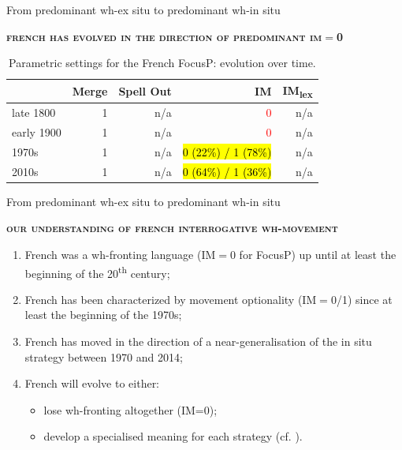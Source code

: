 \documentclass[lesson_slides]{subfiles}
\begin{document}
\begin{frame}[c]{From predominant wh-ex situ to predominant wh-in situ}

        \textbf{\textsc{french has evolved in the direction of predominant im$=$0}}

        \begin{table}[H]
        \centering
        \begin{tabular}{|l|r|r|r|r|}
        \hline
         & Merge & Spell Out & IM & IM\textsubscript{lex} \\
        \hline
        late 1800 & 1 & n/a & \textcolor{red}{0} & n/a \\
        \hline
        early 1900 & 1 & n/a & \textcolor{red}{0} & n/a \\
        \hline
        1970s & 1 & n/a & \hl{0 (22\%) / 1 (78\%)} & n/a \\
        \hline
        2010s & 1 & n/a & \hl{0 (64\%) / 1 (36\%)} & n/a \\
        \hline
        \end{tabular}
        \caption{\label{tab:samp}Parametric settings for the French FocusP: evolution over time.}
    \end{table}
  
\end{frame}
\begin{frame}[c]{From predominant wh-ex situ to predominant wh-in situ}


    \noindent \textbf{\textsc{our understanding of french interrogative wh-movement}} \pause
    \begin{enumerate}
        \item French was a wh-fronting language (IM$=$0 for FocusP) up until at least the beginning of the 20\textsuperscript{th} century;\pause
        \item French has been characterized by movement optionality (IM$=$0/1) since at least the beginning of the 1970s; \pause
        \item French has moved in the direction of a near-generalisation of the in situ strategy between 1970 and 2014; \pause 
        \item French will evolve to either: \pause
        \begin{itemize}
            \item lose wh-fronting altogether (IM=0); \pause
            \item develop a specialised meaning for each strategy (cf. \citealt{faure2021exclusivity}).
        \end{itemize}    
    \end{enumerate}
  
\end{frame}
\end{document}

